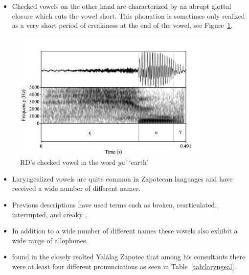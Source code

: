 \documentclass[12pt, letterpaper]{article}
\begin{document}
\begin{itemize}
	\item Checked vowels on the other hand are characterized by an abrupt glottal closure which cuts the vowel short. This phonation is sometimes only realized as a very short period of creakiness at the end of the vowel, see Figure~\ref{fig:CheckedVowel}.  
\end{itemize}

\begin{figure}[!h]
	\centering
	\includegraphics[width=0.9\textwidth]{../RD_yu'.png}
	\caption{RD's checked vowel in the word \textit{yu'} `earth'}
	\label{fig:CheckedVowel}
\end{figure}

\begin{itemize}
	\item Laryngealized vowels are quite common in Zapotecan languages and have received a wide number of different names. 
	\item Previous descriptions have used terms such as broken, rearticulated, interrupted, and creaky \citep{longDiccionarioZapotecoSan2005,avelinobecerraTopicsYalalagZapotec2004,avelinoAcousticElectroglottographicAnalyses2010,sonnenscheinDescriptiveGrammarSan2005,adlerAcousticsPhonationTypes2016,ariza-garciaPhonationTypesTones2018}.  
	\item In addition to a wide number of different names these vowels also exhibit a wide range of allophones.
	\item \citet{avelinoAcousticElectroglottographicAnalyses2010} found in the closely realted Yalálag Zapotec that among his consultants there were at least four different pronunciations as seen in Table~\ref{tab:laryngeal}. 
\end{itemize}
\end{document}

